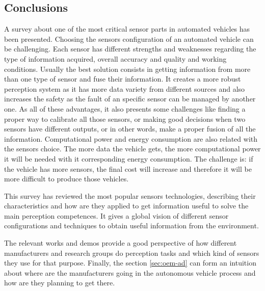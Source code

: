 \subsection{Conclusions}

A survey about one of the most critical sensor parts in automated vehicles has 
been presented. Choosing the sensors configuration of an automated vehicle can 
be challenging. Each sensor has different strengths and weaknesses regarding
the type of information acquired, overall accuracy and quality and working 
conditions. Usually the best solution consists in getting 
information from more than one type of sensor and fuse their information. It 
creates a more robust  perception system as it has more data variety from 
different sources and also increases the safety as the fault of an specific 
sensor can be managed by another one. As all of these advantages, it also 
presents some challenges like finding a proper way to calibrate all those 
sensors, or making good decisions when two sensors have different outputs, or 
in other words, make a proper fusion of all the information. Computational 
power and energy consumption are also related with the sensors choice. The more 
data the vehicle gets, the more computational power it will be needed with it 
corresponding energy consumption. The challenge is: if the vehicle has more 
sensors, the final cost will increase and therefore it will be more difficult  
to produce those vehicles.

This survey has reviewed the most popular sensors technologies, 
describing their characteristics and how are they applied to get information 
useful to solve the main perception competences. It gives a global vision of 
different sensor configurations and techniques to obtain useful information 
from the environment.

The relevant works and demos provide a good perspective of how different 
manufacturers and research groups do perception tasks and which kind of sensors 
they use for that purpose. 
Finally, the section \ref{sec:oem-ad} can form an intuition about where are the 
manufacturers going in the autonomous vehicle process and how are they planning 
to get there.


